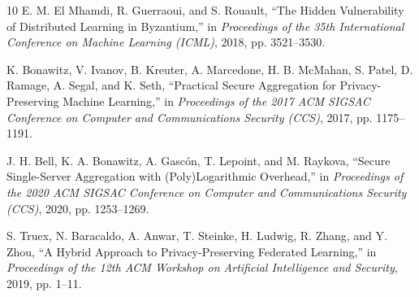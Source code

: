 \documentclass[acmsmall,screen]{acmart}
\begin{document}
\begin{thebibliography}{10}
E. M. El Mhamdi, R. Guerraoui, and S. Rouault,
``The Hidden Vulnerability of Distributed Learning in Byzantium,''
in \textit{Proceedings of the 35th International Conference on Machine Learning (ICML)}, 2018, pp. 3521--3530.

K. Bonawitz, V. Ivanov, B. Kreuter, A. Marcedone, H. B. McMahan, S. Patel, D. Ramage, A. Segal, and K. Seth,
``Practical Secure Aggregation for Privacy-Preserving Machine Learning,''
in \textit{Proceedings of the 2017 ACM SIGSAC Conference on Computer and Communications Security (CCS)}, 2017, pp. 1175--1191.

J. H. Bell, K. A. Bonawitz, A. Gascón, T. Lepoint, and M. Raykova,
``Secure Single-Server Aggregation with (Poly)Logarithmic Overhead,''
in \textit{Proceedings of the 2020 ACM SIGSAC Conference on Computer and Communications Security (CCS)}, 2020, pp. 1253--1269.

S. Truex, N. Baracaldo, A. Anwar, T. Steinke, H. Ludwig, R. Zhang, and Y. Zhou,
``A Hybrid Approach to Privacy-Preserving Federated Learning,''
in \textit{Proceedings of the 12th ACM Workshop on Artificial Intelligence and Security}, 2019, pp. 1--11.


\end{thebibliography}
\end{document}
